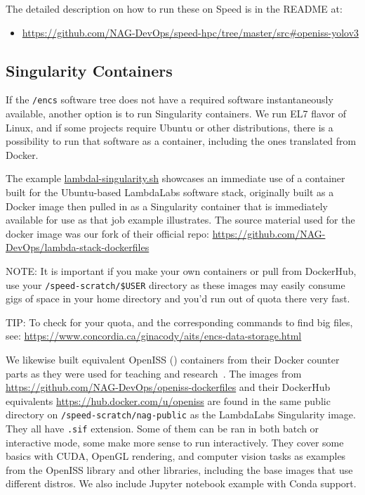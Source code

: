 The detailed description on how to run these on Speed is
in the README at:

\begin{itemize}
	\item \url{https://github.com/NAG-DevOps/speed-hpc/tree/master/src#openiss-yolov3}
\end{itemize}

\subsection{Singularity Containers}
\label{sect:singularity-containers}

If the \texttt{/encs} software tree does not have a required software
instantaneously available, another option is to run Singularity
containers. We run EL7 flavor of Linux, and if some projects
require Ubuntu or other distributions, there is a possibility
to run that software as a container, including the ones
translated from Docker.

The example
  \href{https://github.com/NAG-DevOps/speed-hpc/blob/master/src/lambdal-singularity.sh}
  {lambdal-singularity.sh}
showcases an immediate use of a container built for the Ubuntu-based
LambdaLabs software stack, originally built as a Docker image then
pulled in as a Singularity container that is immediately available
for use as that job example illustrates. The source material
used for the docker image was our fork of their official
repo: \url{https://github.com/NAG-DevOps/lambda-stack-dockerfiles}

NOTE: It is important if you make your own containers or pull from
DockerHub, use your \verb+/speed-scratch/$USER+ directory as these
images may easily consume gigs of space in your home directory
and you'd run out of quota there very fast.

TIP: To check for your quota, and the corresponding commands
to find big files, see: \url{https://www.concordia.ca/ginacody/aits/encs-data-storage.html}

We likewise built equivalent OpenISS ()
containers from their Docker counter parts as they were used for teaching and
research~\cite{oi-containers-poster-siggraph2023}. The
images from \url{https://github.com/NAG-DevOps/openiss-dockerfiles}
and their DockerHub equivalents \url{https://hub.docker.com/u/openiss}
are found in the same public directory on \verb+/speed-scratch/nag-public+
as the LambdaLabs Singularity image. They all have \texttt{.sif} extension.
Some of them can be ran in both batch or interactive mode, some
make more sense to run interactively. They cover some basics with CUDA,
OpenGL rendering, and computer vision tasks as examples from the OpenISS
library and other libraries, including the base images that use different
distros. We also include Jupyter notebook example with Conda support.

